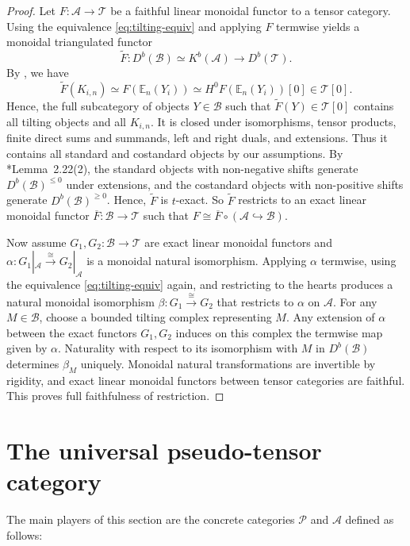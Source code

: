 \documentclass[11pt,oneside]{amsart}
\theoremstyle{definition}
\theoremstyle{remark}
\newcommand\EE{\mathbb E}
\newcommand\cA{\mathcal A}
\newcommand\cB{\mathcal B}
\newcommand\cP{\mathcal P}
\newcommand\cT{\mathcal T}
\renewcommand\:\colon
\begin{document}
\begin{proof}
Let $F\:\cA\to\cT$ be a faithful linear monoidal functor to a tensor category.
Using the equivalence \eqref{eq:tilting-equiv} and applying $F$ termwise yields a monoidal triangulated functor
$$
\tilde F: D^b(\cB) \simeq K^b(\cA) \longrightarrow D^b(\cT) .
$$
By , we have
$$
\tilde F(K_{i,n})\simeq F(\EE_n(Y_i))\simeq H^0 F(\EE_n(Y_i))[0] \in\cT[0].
$$
Hence, the full subcategory of objects $Y\in\cB$ such that $\tilde F(Y)\in\cT[0]$ contains all tilting objects and all $K_{i,n}$. It is closed under isomorphisms, tensor products, finite direct sums and summands, left and right duals, and extensions. Thus it contains all standard and costandard objects by our assumptions. By \cite{FG}*{Lemma~2.22(2)}, the standard objects with non-negative shifts generate $D^b(\cB)^{\le0}$ under extensions, and the costandard objects with non-positive shifts generate $D^b(\cB)^{\ge0}$. Hence, $\tilde F$ is $t$-exact. So $\tilde F$ restricts to an exact linear monoidal functor $\overline{F}\:\cB\to\cT$ such that $F\cong\overline{F} \circ (\cA\hookrightarrow\cB)$.

Now assume $G_1,G_2\:\cB\to\cT$ are exact linear monoidal functors and $\alpha\:G_1|_{\cA}\xrightarrow{\cong} G_2|_{\cA}$ is a monoidal natural isomorphism. Applying $\alpha$ termwise, using the equivalence \eqref{eq:tilting-equiv} again, and restricting to the hearts produces a natural monoidal isomorphism $\beta\:G_1\xrightarrow{\cong} G_2$ that restricts to $\alpha$ on $\cA$. For any $M\in\cB$, choose a bounded tilting complex representing $M$. Any extension of $\alpha$ between the exact functors $G_1,G_2$ induces on this complex the termwise map given by $\alpha$. Naturality with respect to its isomorphism with $M$ in $D^b(\cB)$ determines $\beta_M$ uniquely. Monoidal natural transformations are invertible by rigidity, and exact linear monoidal functors between tensor categories are faithful. This proves full faithfulness of restriction.
\end{proof}

\section{The universal pseudo-tensor category}
The main players of this section are the concrete categories $\cP$ and $\cA$ defined as follows:
\end{document}
